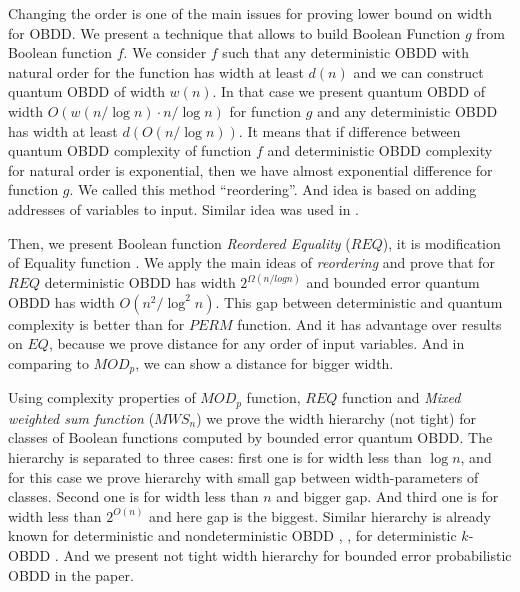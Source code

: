 \documentclass{llncs}
\begin{document}
Changing the order is one of the main issues for proving lower bound on width for OBDD.  We present a technique that allows to build Boolean Function $g$ from Boolean function $f$. We consider $f$ such that any deterministic OBDD with natural order for the function  has width at least $d(n)$ and we can construct quantum OBDD of width $w(n)$. In that case we present quantum OBDD of width $O(w(n/\log n)\cdot n/\log n)$ for function $g$ and any deterministic OBDD has width at least $d(O(n/\log n))$. It means that if difference between quantum OBDD complexity of function $f$ and deterministic OBDD complexity for natural order is exponential, then we have almost exponential difference for function $g$. We called this method ``reordering''. And idea is based on adding addresses of variables to input. Similar idea was used in \cite{k15}.

Then, we present Boolean function {\em Reordered Equality} ($REQ$), it is modification of  Equality function \cite{akv2008}. We apply the main ideas of {\em reordering} and prove that for  $REQ$ deterministic OBDD  has width  $2^{\Omega(n/log n)}$ and  bounded error quantum OBDD has width $O(n^2/\log^2 n)$.  This gap between deterministic and quantum complexity is better than for $PERM$ function. And it has advantage over results on $EQ$, because we prove distance for any order of input variables. And in comparing to $MOD_p$, we can show a distance for bigger width.

Using complexity properties of $MOD_p$ function, $REQ$ function and {\em Mixed weighted sum function} ($MWS_n$)\cite{s2005} we prove the width hierarchy (not tight) for classes of Boolean functions computed by bounded error quantum OBDD. The hierarchy is separated to three cases: first one is for width less than $\log n$, and for this case we prove hierarchy with small gap between width-parameters of classes. Second one is for width less than $n$ and bigger gap. And third one is for width less than $2^{O(n)}$ and here gap is the biggest.
Similar hierarchy is already known for deterministic and nondeterministic OBDD \cite{agky14}, \cite{agky16}, for deterministic $k$-OBDD \cite{k15}. And we  present not tight width hierarchy for bounded error probabilistic OBDD in the paper.
\end{document}
